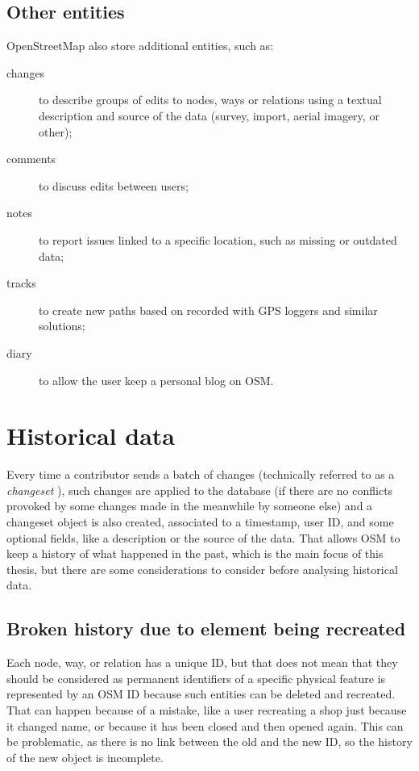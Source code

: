 \documentclass{Configuration_Files/PoliMi3i_thesis}
\begin{document}
\subsection{Other entities}

OpenStreetMap also store additional entities, such as:
\begin{description}
    \item[changes] to describe groups of edits to nodes, ways or relations using a textual description and source of the data (survey, import, aerial imagery, or other);
    \item[comments] to discuss edits between users;
    \item[notes] to report issues linked to a specific location, such as missing or outdated data;
    \item[tracks] to create new paths based on recorded with GPS loggers and similar solutions;
    \item[diary] to allow the user keep a personal blog on OSM.
\end{description}

\section{Historical data}
\label{sec:history}

Every time a contributor sends a batch of changes (technically referred to as a \textit{changeset} \cite{ChangesetOpenStreetMapWiki}), such changes are applied to the database (if there are no conflicts provoked by some changes made in the meanwhile by someone else) and a changeset object is also created, associated to a timestamp, user ID, and some optional fields, like a description or the source of the data. That allows OSM to keep a history of what happened in the past, which is the main focus of this thesis, but there are some considerations to consider before analysing historical data.

\subsection{Broken history due to element being recreated}

Each node, way, or relation has a unique ID, but that does not mean that they should be considered as permanent identifiers of a specific physical feature is represented by an OSM ID because such entities can be deleted and recreated. That can happen because of a mistake, like a user recreating a shop just because it changed name, or because it has been closed and then opened again. This can be problematic, as there is no link between the old and the new ID, so the history of the new object is incomplete.
\end{document}
